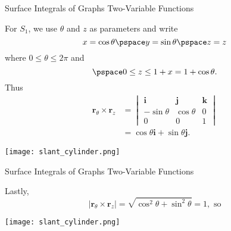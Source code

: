 \documentclass[11pt,english,
handout
]{beamer}
\begin{document}
\begin{frame}[t]{Surface Integrals of Graphs Two-Variable Functions}
\small
\begin{example}

\vspace{3mm}
\begin{minipage}[c]{0.5\textwidth}
For $S_1$, we use $\theta$ and $z$ as parameters and write 
\[
x=\cos\theta\pspace y=\sin\theta\pspace z=z
\]
where $0\leq\theta \leq 2\pi$ and 
\[
\pspace 0\leq z\leq 1+x=1+\cos\theta.
\]
Thus
\begin{align*}
\mathbf{r}_\theta\times\mathbf{r}_z&=\begin{vmatrix}\mathbf{i}&\mathbf{j}&\mathbf{k}\\[2mm] -\sin\theta & \cos\theta & 0\\[2mm] 0 & 0 & 1\end{vmatrix}\\[2mm]
&=\cos\theta\mathbf{i}+\sin\theta\mathbf{j}.
\end{align*}
\end{minipage}%
\begin{minipage}[c]{0.5\textwidth}
\begin{center}
\texttt{[image: slant\_cylinder.png]}
\end{center}
\end{minipage}
\end{example}
\end{frame}











\begin{frame}[t]{Surface Integrals of Graphs Two-Variable Functions}
\small
\begin{example}

\vspace{3mm}
\begin{minipage}{0.5\textwidth}
Lastly, 
\[
|\mathbf{r}_\theta\times\mathbf{r}_z|=\sqrt{\cos^2\theta+\sin^2\theta}=1,\text{ so}
\]
\end{minipage}%
\begin{minipage}{0.5\textwidth}
\begin{center}
\texttt{[image: slant\_cylinder.png]}
\end{center}
\end{minipage}
\end{example}
\end{frame}
\end{document}
